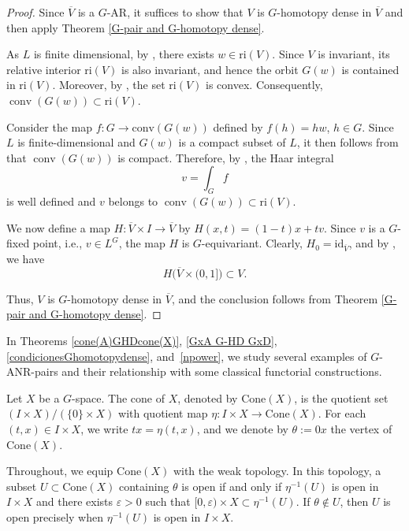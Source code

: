 \documentclass[12pt]{amsart}
\theoremstyle{definition}
\begin{document}
	\begin{proof}
		Since $\overline{V}$ is a $G$-AR, it suffices to show that $V$ is $G$-homotopy dense in $\overline{V}$ and then apply Theorem \ref{G-pair and G-homotopy dense}.
		
		As $L$ is finite dimensional, by \cite[Theorem 2.3.1]{RW}, there exists $w \in \mathrm{ri}(V)$. Since $V$ is invariant, its relative interior $\mathrm{ri}(V)$ is also invariant, and hence the orbit $G(w)$ is contained in $\mathrm{ri}(V)$. Moreover, by \cite[Theorem 2.3.5]{RW}, the set $\mathrm{ri}(V)$ is convex. Consequently, $\operatorname{conv}(G(w)) \subset \mathrm{ri}(V)$.
		
		Consider the map  $f: G\rightarrow \text{conv}(G(w))$ defined by $f(h)=hw$, $h\in G$. Since $L$ is finite-dimensional and $G(w)$ is a compact subset of $L$, it then follows from \cite[Theorem 3.20]{WR} that $\operatorname{conv}(G(w))$ is compact. Therefore, by \cite[Theorem 3.27]{WR}, the Haar integral 
		\[
		v = \int_G f
		\]
		is well defined and 	$v$	belongs to $\operatorname{conv}(G(w)) \subset \mathrm{ri}(V)$.
		
		We now define a map $H: \overline{V}\times I\rightarrow \overline{V}$ by $H(x,t)=(1-t)x+tv$. Since $v$ is a $G$-fixed point, i.e.,     $v \in L^G$, the map $H$ is $G$-equivariant. Clearly, $H_0 = \mathrm{id}_{\overline{V}}$, and by \cite[Theorem 2.3.4]{RW}, we have 
		\[
		H\big(\overline{V} \times (0,1]\big) \subset V.
		\]
		
		Thus, $V$ is $G$-homotopy dense in $\overline{V}$, and the conclusion follows from Theorem \ref{G-pair and G-homotopy dense}.
	\end{proof}
	
	In Theorems \ref{cone(A)GHDcone(X)}, \ref{GxA G-HD GxD}, \ref{condicionesGhomotopydense}, and~\ref{npower}, we study several examples of	$G$-ANR-pairs and their relationship with some classical functorial constructions.
	
	Let $X$ be a $G$-space. The cone of $X$, denoted by $\mathrm{Cone}(X)$, is the quotient set $(I\times X)/(\{0\}\times X)$ with quotient map $\eta:I\times X\rightarrow \mathrm{Cone}(X)$. For each $(t,x)\in I\times X$, we write $tx=\eta(t,x)$, and we denote by $\theta:=0x$ the vertex of $\mathrm{Cone}(X)$.
	
	Throughout, we equip $\mathrm{Cone}(X)$ with the weak topology. In this topology, a subset $U \subset \mathrm{Cone}(X)$ containing $\theta$ is open if and only if $\eta^{-1}(U)$ is open in $I\times X$ and there exists $\varepsilon > 0$ such that $[0,\varepsilon)\times X \subset \eta^{-1}(U)$. If $\theta \notin U$, then $U$ is open precisely when $\eta^{-1}(U)$ is open in $I\times X$. 
	
\end{document}
